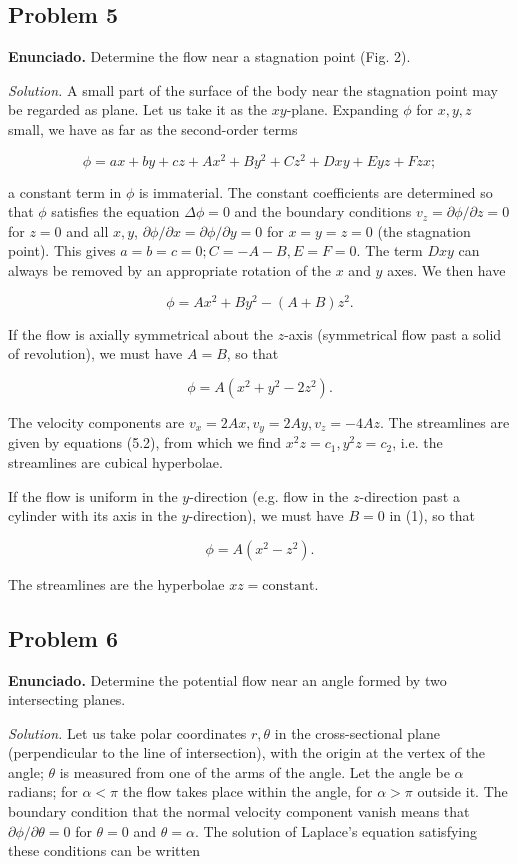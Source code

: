 \documentclass{article}
\begin{document}
\subsection*{Problem 5}

\textbf{Enunciado.} Determine the flow near a stagnation point (Fig. 2).

\textit{Solution.} A small part of the surface of the body near the stagnation point may be regarded as plane. Let us take it as the $xy$-plane. Expanding $\phi$ for $x, y, z$ small, we have as far as the second-order terms

$$
\phi = ax + by + cz + Ax^2 + By^2 + Cz^2 + Dxy + Eyz + Fzx;
$$

a constant term in $\phi$ is immaterial. The constant coefficients are determined so that $\phi$ satisfies the equation $\Delta \phi = 0$ and the boundary conditions $v_z = \partial \phi/\partial z = 0$ for $z = 0$ and all $x, y$, $\partial \phi/\partial x = \partial \phi/\partial y = 0$ for $x = y = z = 0$ (the stagnation point). This gives $a = b = c = 0; C = -A - B, E = F = 0$. The term $Dxy$ can always be removed by an appropriate rotation of the $x$ and $y$ axes. We then have

$$
\phi = Ax^2 + By^2 - (A + B)z^2. \tag{1}
$$

If the flow is axially symmetrical about the $z$-axis (symmetrical flow past a solid of revolution), we must have $A = B$, so that

$$
\phi = A(x^2 + y^2 - 2z^2).
$$

The velocity components are $v_x = 2Ax, v_y = 2Ay, v_z = -4Az$. The streamlines are given by equations (5.2), from which we find $x^2z = c_1, y^2z = c_2$, i.e. the streamlines are cubical hyperbolae.

If the flow is uniform in the $y$-direction (e.g. flow in the $z$-direction past a cylinder with its axis in the $y$-direction), we must have $B = 0$ in (1), so that

$$
\phi = A(x^2 - z^2).
$$

The streamlines are the hyperbolae $xz = \text{constant}$.

\subsection*{Problem 6}

\textbf{Enunciado.} Determine the potential flow near an angle formed by two intersecting planes.

\textit{Solution.} Let us take polar coordinates $r, \theta$ in the cross-sectional plane (perpendicular to the line of intersection), with the origin at the vertex of the angle; $\theta$ is measured from one of the arms of the angle. Let the angle be $\alpha$ radians; for $\alpha < \pi$ the flow takes place within the angle, for $\alpha > \pi$ outside it. The boundary condition that the normal velocity component vanish means that $\partial \phi/\partial \theta = 0$ for $\theta = 0$ and $\theta = \alpha$. The solution of Laplace's equation satisfying these conditions can be written
\end{document}
